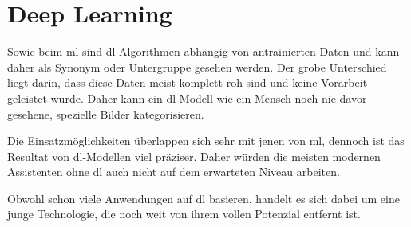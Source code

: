 \section{Deep Learning}

Sowie beim \gls{ml} sind \gls{dl}-Algorithmen abhängig von antrainierten Daten und kann daher als Synonym oder Untergruppe gesehen werden. Der grobe Unterschied liegt darin, dass diese Daten meist komplett roh sind und keine Vorarbeit geleistet wurde. Daher kann ein \gls{dl}-Modell wie ein Mensch noch nie davor gesehene, spezielle Bilder kategorisieren. 

Die Einsatzmöglichkeiten überlappen sich sehr mit jenen von \gls{ml}, dennoch ist das Resultat von \gls{dl}-Modellen viel präziser. Daher würden die meisten modernen Assistenten ohne \gls{dl} auch nicht auf dem erwarteten Niveau arbeiten. 

Obwohl schon viele Anwendungen auf \Gls{dl} basieren, handelt es sich dabei um eine junge Technologie, die noch weit von ihrem vollen Potenzial entfernt ist.
